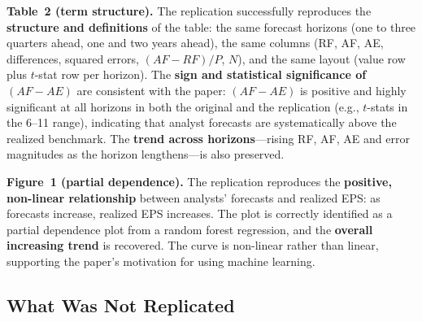 \documentclass[11pt]{article}
\begin{document}
\textbf{Table~2 (term structure).} The replication successfully reproduces the \textbf{structure and definitions} of the table: the same forecast horizons (one to three quarters ahead, one and two years ahead), the same columns (RF, AF, AE, differences, squared errors, $(AF-RF)/P$, $N$), and the same layout (value row plus $t$-stat row per horizon). The \textbf{sign and statistical significance of $(AF-AE)$} are consistent with the paper: $(AF-AE)$ is positive and highly significant at all horizons in both the original and the replication (e.g., $t$-stats in the 6--11 range), indicating that analyst forecasts are systematically above the realized benchmark. The \textbf{trend across horizons}---rising RF, AF, AE and error magnitudes as the horizon lengthens---is also preserved.

\textbf{Figure~1 (partial dependence).} The replication reproduces the \textbf{positive, non-linear relationship} between analysts' forecasts and realized EPS: as forecasts increase, realized EPS increases. The plot is correctly identified as a partial dependence plot from a random forest regression, and the \textbf{overall increasing trend} is recovered. The curve is non-linear rather than linear, supporting the paper's motivation for using machine learning.

\subsection{What Was Not Replicated}
\end{document}
